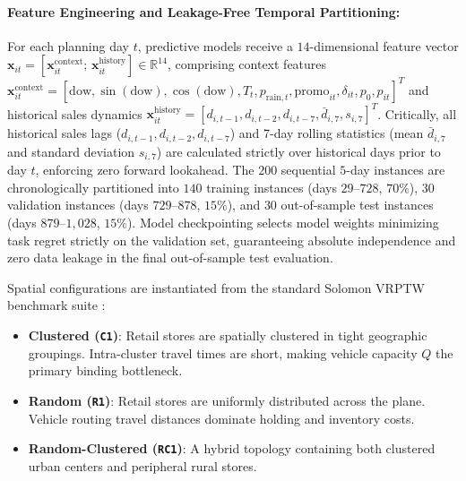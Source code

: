 \documentclass[11pt,a4paper]{article}
\theoremstyle{definition}
\theoremstyle{remark}
\begin{document}
\paragraph{Feature Engineering and Leakage-Free Temporal Partitioning:}
For each planning day $t$, predictive models receive a $14$-dimensional feature vector $\mathbf{x}_{it} = [\mathbf{x}_{it}^{\text{context}}; \, \mathbf{x}_{it}^{\text{history}}] \in \mathbb{R}^{14}$, comprising context features $\mathbf{x}_{it}^{\text{context}} = [\text{dow}, \sin(\text{dow}), \cos(\text{dow}), T_t, p_{\text{rain}, t}, \text{promo}_{it}, \delta_{it}, p_0, p_{it}]^T$ and historical sales dynamics $\mathbf{x}_{it}^{\text{history}} = [d_{i, t-1}, d_{i, t-2}, d_{i, t-7}, \bar{d}_{i, 7}, s_{i, 7}]^T$. Critically, all historical sales lags ($d_{i, t-1}, d_{i, t-2}, d_{i, t-7}$) and 7-day rolling statistics (mean $\bar{d}_{i, 7}$ and standard deviation $s_{i, 7}$) are calculated strictly over historical days prior to day $t$, enforcing zero forward lookahead. The $200$ sequential $5$-day instances are chronologically partitioned into $140$ training instances (days $29$--$728$, $70\%$), $30$ validation instances (days $729$--$878$, $15\%$), and $30$ out-of-sample test instances (days $879$--$1{,}028$, $15\%$). Model checkpointing selects model weights minimizing task regret strictly on the validation set, guaranteeing absolute independence and zero data leakage in the final out-of-sample test evaluation.

Spatial configurations are instantiated from the standard Solomon VRPTW benchmark suite \citep{solomon1987algorithms}:
\begin{itemize}[leftmargin=*]
    \item \textbf{Clustered (\texttt{C1})}: Retail stores are spatially clustered in tight geographic groupings. Intra-cluster travel times are short, making vehicle capacity $Q$ the primary binding bottleneck.
    \item \textbf{Random (\texttt{R1})}: Retail stores are uniformly distributed across the plane. Vehicle routing travel distances dominate holding and inventory costs.
    \item \textbf{Random-Clustered (\texttt{RC1})}: A hybrid topology containing both clustered urban centers and peripheral rural stores.
\end{itemize}
\end{document}
